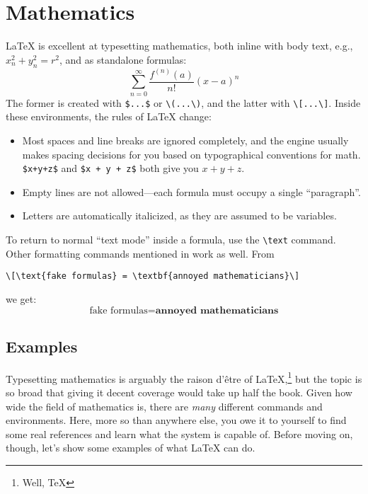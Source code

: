 \chapter{Mathematics}

\LaTeX{} is excellent at typesetting mathematics, both inline with body text,
e.g., $x_n^2+y_n^2=r^2$, and as standalone formulas:
\[\sum_{n=0}^{\infty} \frac{f^{(n)} (a)}{n!} (x - a)^n\]
The former is created with \verb|$...$| or \verb|\(...\)|,
and the latter with \verb|\[...\]|.
Inside these environments, the rules of \LaTeX{} change:
\begin{itemize}
\item Most spaces and line breaks are ignored completely,
    and the engine usually makes spacing decisions for you based on
    typographical conventions for math.
    \verb|$x+y+z$| and \verb|$x + y + z$| both give you $x+y+z$.
\item Empty lines are not allowed---each formula must occupy a single
    ``paragraph''\quotekern.
\item Letters are automatically italicized, as they are assumed to be variables.
\end{itemize}
To return to normal ``text mode'' inside a formula, use the \verb|\text| command.
Other formatting commands mentioned in  work as well.
From
\begin{leftfigure}
\begin{lstlisting}
\[\text{fake formulas} = \textbf{annoyed mathematicians}\]
\end{lstlisting}
\end{leftfigure}
we get:
\[\text{fake formulas} = \textbf{annoyed mathematicians}\]

\section{Examples}

Typesetting mathematics is arguably the raison d'être of
\LaTeX,\punckern\footnote{Well, \TeX} but the topic is so broad that giving
it decent coverage would take up half the book.
Given how wide the field of mathematics is,
there are \emph{many} different commands and environments.
Here, more so than anywhere else,
you owe it to yourself to find some real references and learn what the system
is capable of.
Before moving on, though, let's show some examples of what \LaTeX{}
can do.
\newpage

